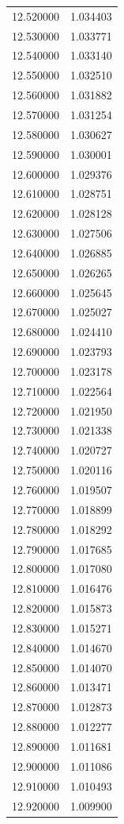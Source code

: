 \begin{tabular}{rr}
12.520000 & 1.034403 \\
12.530000 & 1.033771 \\
12.540000 & 1.033140 \\
12.550000 & 1.032510 \\
12.560000 & 1.031882 \\
12.570000 & 1.031254 \\
12.580000 & 1.030627 \\
12.590000 & 1.030001 \\
12.600000 & 1.029376 \\
12.610000 & 1.028751 \\
12.620000 & 1.028128 \\
12.630000 & 1.027506 \\
12.640000 & 1.026885 \\
12.650000 & 1.026265 \\
12.660000 & 1.025645 \\
12.670000 & 1.025027 \\
12.680000 & 1.024410 \\
12.690000 & 1.023793 \\
12.700000 & 1.023178 \\
12.710000 & 1.022564 \\
12.720000 & 1.021950 \\
12.730000 & 1.021338 \\
12.740000 & 1.020727 \\
12.750000 & 1.020116 \\
12.760000 & 1.019507 \\
12.770000 & 1.018899 \\
12.780000 & 1.018292 \\
12.790000 & 1.017685 \\
12.800000 & 1.017080 \\
12.810000 & 1.016476 \\
12.820000 & 1.015873 \\
12.830000 & 1.015271 \\
12.840000 & 1.014670 \\
12.850000 & 1.014070 \\
12.860000 & 1.013471 \\
12.870000 & 1.012873 \\
12.880000 & 1.012277 \\
12.890000 & 1.011681 \\
12.900000 & 1.011086 \\
12.910000 & 1.010493 \\
12.920000 & 1.009900 \\

\end{tabular}
